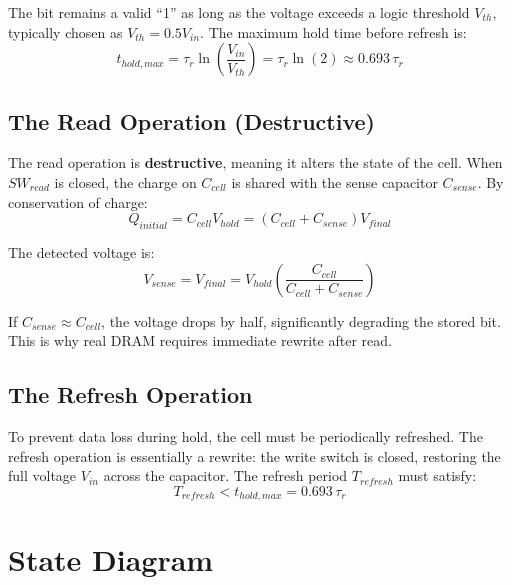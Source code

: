 \documentclass[12pt,a4paper]{report}
\begin{document}
The bit remains a valid ``1'' as long as the voltage exceeds a logic threshold $V_{th}$, typically chosen as $V_{th} = 0.5 V_{in}$. The maximum hold time before refresh is:
\begin{equation}
    t_{hold,max} = \tau_r \ln\left(\frac{V_{in}}{V_{th}}\right) = \tau_r \ln(2) \approx 0.693 \, \tau_r
    \label{eq:hold_max}
\end{equation}

\subsection{The Read Operation (Destructive)}

The read operation is \textbf{destructive}, meaning it alters the state of the cell. When $SW_{read}$ is closed, the charge on $C_{cell}$ is shared with the sense capacitor $C_{sense}$. By conservation of charge:
\begin{equation}
    Q_{initial} = C_{cell} V_{hold} = (C_{cell} + C_{sense}) V_{final}
    \label{eq:charge_conservation}
\end{equation}

The detected voltage is:
\begin{equation}
    V_{sense} = V_{final} = V_{hold} \left( \frac{C_{cell}}{C_{cell} + C_{sense}} \right)
    \label{eq:V_sense}
\end{equation}

If $C_{sense} \approx C_{cell}$, the voltage drops by half, significantly degrading the stored bit. This is why real DRAM requires immediate rewrite after read.

\subsection{The Refresh Operation}

To prevent data loss during hold, the cell must be periodically refreshed. The refresh operation is essentially a rewrite: the write switch is closed, restoring the full voltage $V_{in}$ across the capacitor. The refresh period $T_{refresh}$ must satisfy:
\begin{equation}
    T_{refresh} < t_{hold,max} = 0.693 \, \tau_r
    \label{eq:refresh_period}
\end{equation}

\section{State Diagram}
\end{document}
